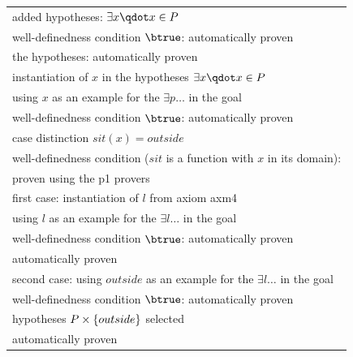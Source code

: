 \begin{tabular}{l}
  \hline
  added hypotheses: $\exists x\qdot x\in P$ \\
  \quad well-definedness condition $\btrue$: automatically proven\\
  \quad the hypotheses: automatically proven \\
  \quad instantiation of $x$ in the hypotheses $\exists x\qdot x\in P$\\
  \qquad using $x$ as an example for the $\exists p \ldots$ in the goal\\
  \quad\qquad well-definedness condition $\btrue$: automatically proven\\
  \quad\qquad case distinction $sit(x)=outside$ \\
  \qquad\qquad well-definedness condition
    ($sit$ is a function with $x$ in its domain): \\
  \qquad\qquad\qquad\qquad\qquad\qquad proven using the \textsf{p1} provers\\
  \qquad\qquad first case: instantiation of $l$ from axiom \textsf{axm4}\\
  \quad\qquad\qquad using $l$ as an example for the $\exists l \ldots$ in the goal\\
  \qquad\qquad\qquad well-definedness condition $\btrue$: automatically proven\\
  \qquad\qquad\qquad automatically proven\\
  \qquad\qquad second case: using $outside$ as an example for the $\exists l \ldots$ in the goal\\
  \quad\qquad\qquad well-definedness condition $\btrue$: automatically proven\\
  \quad\qquad\qquad hypotheses $P\mathbin\times\{outside\}$ selected\\
  \qquad\qquad\qquad automatically proven\\
  \hline
\end{tabular}
